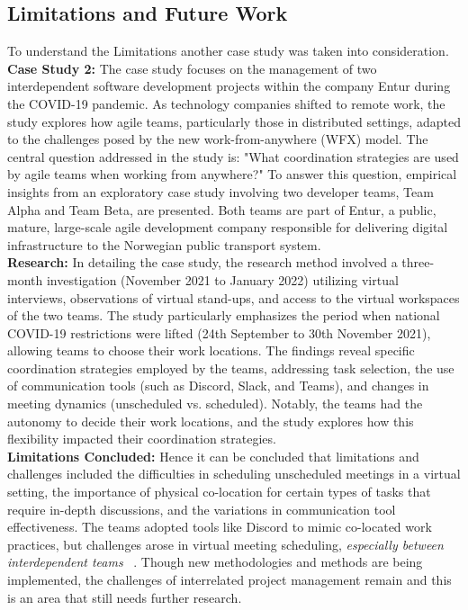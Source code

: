 \documentclass{llncs}
\begin{document}
\subsection{Limitations and Future Work}
To understand the Limitations another case study was taken into consideration.~\cite{refpaper9}
\textbf{Case Study 2:} The case study focuses on the management of two interdependent software development projects within the company Entur during the COVID-19 pandemic. As technology companies shifted to remote work, the study explores how agile teams, particularly those in distributed settings, adapted to the challenges posed by the new work-from-anywhere (WFX) model. The central question addressed in the study is: "What coordination strategies are used by agile teams when working from anywhere?" To answer this question, empirical insights from an exploratory case study involving two developer teams, Team Alpha and Team Beta, are presented. Both teams are part of Entur, a public, mature, large-scale agile development company responsible for delivering digital infrastructure to the Norwegian public transport system.\\
\textbf{Research:} In detailing the case study, the research method involved a three-month investigation (November 2021 to January 2022) utilizing virtual interviews, observations of virtual stand-ups, and access to the virtual workspaces of the two teams. The study particularly emphasizes the period when national COVID-19 restrictions were lifted (24th September to 30th November 2021), allowing teams to choose their work locations. The findings reveal specific coordination strategies employed by the teams, addressing task selection, the use of communication tools (such as Discord, Slack, and Teams), and changes in meeting dynamics (unscheduled vs. scheduled). Notably, the teams had the autonomy to decide their work locations, and the study explores how this flexibility impacted their coordination strategies.~\cite{refpaper9}~\cite{refpaper10} \\
\textbf{Limitations Concluded:} Hence it can be concluded that limitations and challenges included the difficulties in scheduling unscheduled meetings in a virtual setting, the importance of physical co-location for certain types of tasks that require in-depth discussions, and the variations in communication tool effectiveness. The teams adopted tools like Discord to mimic co-located work practices, but challenges arose in virtual meeting scheduling, \textit{especially between interdependent teams} ~\cite{refpaper9}. Though new methodologies and methods are being implemented, the challenges of interrelated project management remain and this is an area that still needs further research.
\end{document}
